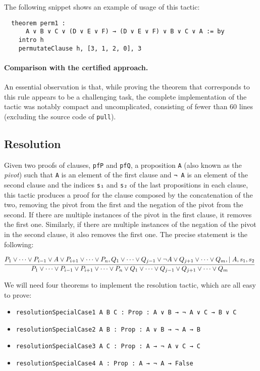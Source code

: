 The following snippet shows an example of usage of this tactic:

\begin{verbatim}
  theorem perm1 :
      A ∨ B ∨ C ∨ (D ∨ E ∨ F) → (D ∨ E ∨ F) ∨ B ∨ C ∨ A := by
    intro h
    permutateClause h, [3, 1, 2, 0], 3
\end{verbatim}

\paragraph{Comparison with the certified approach.} An essential observation is that, while proving the theorem that corresponds to this rule appears to be a
challenging task, the complete implementation of the tactic was notably compact and uncomplicated, consisting of fewer
than 60 lines (excluding the source code of \texttt{pull}).


\subsection*{Resolution}

Given two proofs of clauses, \texttt{pfP} and \texttt{pfQ}, a proposition \texttt{A}
(also known as the \textit{pivot}) such that
\texttt{A} is an element of the first clause and \texttt{¬ A} is an element of the second clause and the indices \texttt{s₁} and \texttt{s₂} of the last propositions in each clause, this tactic produces a proof for the clause composed by the concatenation
of the two, removing the pivot from the first and the negation of the pivot from the second. If there are multiple instances of the pivot in the first clause, it removes
the first one. Similarly, if there are multiple instances of the negation of the pivot
in the second clause, it also removes the first one. The precise statement
is the following:

\[
  \infer[]{P_{1} \vee \cdots \vee P_{i - 1} \vee P_{i + 1} \vee \cdots \vee P_{n} \vee Q_{1} \vee \cdots \vee Q_{j - 1} \vee Q_{j + 1} \vee \cdots \vee Q_{m}}{P_{1} \vee \cdots \vee P_{i - 1} \vee A \vee P_{i + 1} \vee \cdots \vee P_{n}, Q_{1} \vee \cdots \vee Q_{j - 1} \vee \neg A \vee Q_{j + 1} \vee \cdots \vee Q_{m}, \mid A, s_{1}, s_{2}}
\]

We will need four theorems to implement the resolution tactic, which are all easy to prove:

\begin{itemize}
  \item \texttt{resolutionSpecialCase1 {A B C : Prop} : A ∨ B → ¬ A ∨ C → B ∨ C}
  \item \texttt{resolutionSpecialCase2 {A B : Prop} : A ∨ B → ¬ A → B}
  \item \texttt{resolutionSpecialCase3 {A C : Prop} : A → ¬ A ∨ C → C}
  \item \texttt{resolutionSpecialCase4 {A : Prop} : A → ¬ A → False}
\end{itemize}

